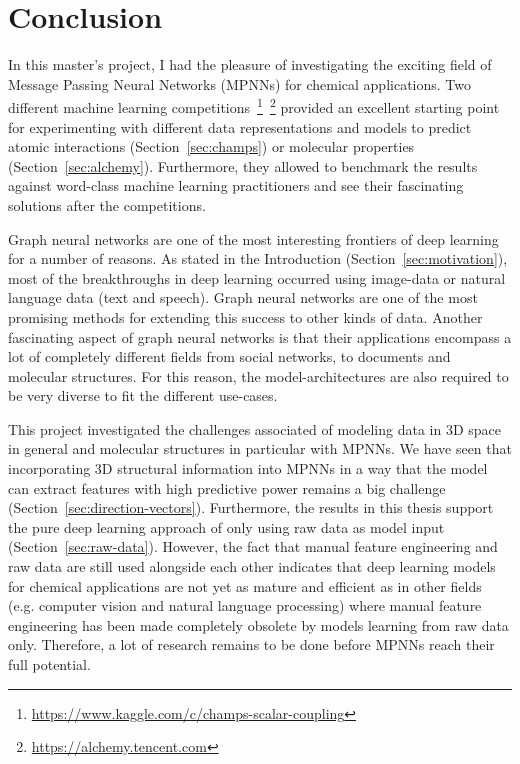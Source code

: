 \chapter{Conclusion}
\label{chapter:Conclusion}

In this master's project, I had the pleasure of investigating the exciting field of Message Passing Neural Networks (MPNNs) for chemical applications. Two different machine learning competitions~\footnote{\url{https://www.kaggle.com/c/champs-scalar-coupling}}~\footnote{\url{https://alchemy.tencent.com}} provided an excellent starting point for experimenting with different data representations and models to predict atomic interactions (Section~\ref{sec:champs}) or molecular properties (Section~\ref{sec:alchemy}). Furthermore, they allowed to benchmark the results against word-class machine learning practitioners and see their fascinating solutions after the competitions.

Graph neural networks are one of the most interesting frontiers of deep learning for a number of reasons. As stated in the Introduction (Section~\ref{sec:motivation}), most of the breakthroughs in deep learning occurred using image-data or natural language data (text and speech). Graph neural networks are one of the most promising methods for extending this success to other kinds of data. Another fascinating aspect of graph neural networks is that their applications encompass a lot of completely different fields from social networks, to documents and molecular structures. For this reason, the model-architectures are also required to be very diverse to fit the different use-cases.

This project investigated the challenges associated of modeling data in 3D space in general and molecular structures in particular with MPNNs. We have seen that incorporating 3D structural information into MPNNs in a way that the model can extract features with high predictive power remains a big challenge (Section~\ref{sec:direction-vectors}). Furthermore, the results in this thesis support the pure deep learning approach of only using raw data as model input (Section~\ref{sec:raw-data}). However, the fact that manual feature engineering and raw data are still used alongside each other indicates that deep learning models for chemical applications are not yet as mature and efficient as in other fields (e.g. computer vision and natural language processing) where manual feature engineering has been made completely obsolete by models learning from raw data only. Therefore, a lot of research remains to be done before MPNNs reach their full potential.

